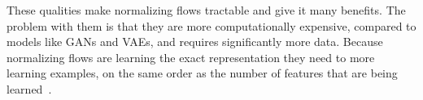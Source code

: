 These qualities make normalizing flows tractable and give it many benefits. The
problem with them is that they are more computationally expensive, compared to
models like GANs and VAEs, and requires significantly more data. Because
normalizing flows are learning the exact representation they need to more
learning examples, on the same order as the number of features that are being
learned~\cite{jainilecture}.
